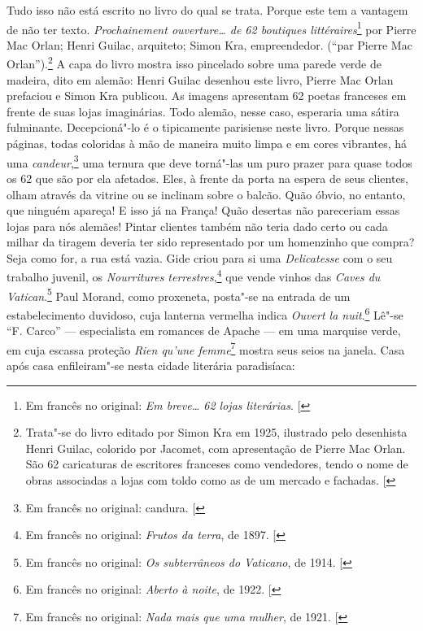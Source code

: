 Tudo isso não está escrito no livro do qual se trata. Porque este tem
a vantagem de não ter texto. \emph{Prochainement ouverture\ldots{} de 62 boutiques littéraires}\footnote{Em francês no original: \emph{Em breve\ldots{} 62 lojas literárias}. {[}\versal{N. T.}{]}} 
por Pierre Mac Orlan; Henri Guilac, arquiteto; Simon Kra,
empreendedor. (``par Pierre Mac Orlan'').\footnote{Trata"-se do %
  livro editado por Simon Kra em 1925, ilustrado pelo desenhista Henri
  Guilac, colorido por Jacomet, com apresentação de Pierre Mac Orlan.
  São 62 caricaturas de escritores franceses como vendedores, tendo o
  nome de obras associadas a lojas com toldo como as de um mercado e
  fachadas. {[}\versal{N. E.}{]}} A capa do livro mostra isso pincelado sobre uma
parede verde de madeira, dito em alemão: Henri Guilac desenhou este
livro, Pierre Mac Orlan prefaciou e Simon Kra publicou. As imagens
apresentam 62 poetas franceses em frente de suas lojas imaginárias. Todo
alemão, nesse caso, esperaria uma sátira fulminante. Decepcioná"-lo é o
tipicamente parisiense neste livro. Porque nessas páginas, todas
coloridas à mão de maneira muito limpa e em cores vibrantes, há uma
\emph{candeur},\footnote{Em francês no original: candura. {[}\versal{N. T.}{]}}
uma ternura que deve torná"-las um puro prazer para quase todos os 62 que
são por ela afetados. Eles, à frente da porta na espera de seus
clientes, olham através da vitrine ou se inclinam sobre o balcão. Quão
óbvio, no entanto, que ninguém apareça! E isso já na França! Quão
desertas não pareceriam essas lojas para nós alemães! Pintar clientes
também não teria dado certo ou cada milhar da tiragem deveria ter sido
representado por um homenzinho que compra? Seja como for, a rua está
vazia. Gide criou para si uma \emph{Delicatesse} com o seu trabalho
juvenil, os \emph{Nourritures terrestres},\footnote{Em francês no original: \emph{Frutos da
  terra}, de 1897. {[}\versal{N.~T.}{]}} que vende vinhos das \emph{Caves
du Vatican}.\footnote{Em francês no original: \emph{Os subterrâneos do Vaticano}, de 1914.
  {[}\versal{N.~T.}{]}} Paul Morand, como proxeneta, posta"-se na entrada de um
estabelecimento duvidoso, cuja lanterna vermelha indica \emph{Ouvert la
nuit}.\footnote{Em francês no original: \emph{Aberto à noite}, de 1922. {[}\versal{N.~T.}{]}} Lê"-se
``F. Carco'' --- especialista em romances de Apache --- em uma marquise
verde, em cuja escassa proteção \emph{Rien qu'une femme}\footnote{Em francês no original:
\emph{Nada mais que uma mulher}, de 1921. {[}\versal{N.~T.}{]}} mostra seus seios na
janela. Casa após casa enfileiram"-se nesta cidade literária paradisíaca:
